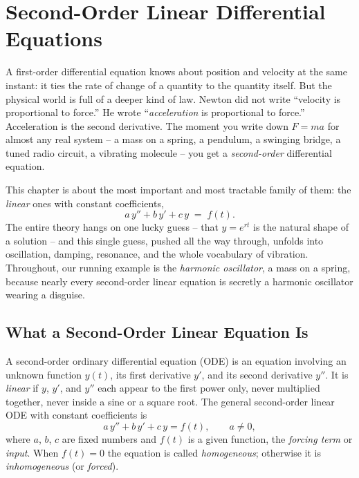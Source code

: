 \chapter{Second-Order Linear Differential Equations}

A first-order differential equation knows about position and velocity at the
same instant: it ties the rate of change of a quantity to the quantity itself.
But the physical world is full of a deeper kind of law. Newton did not write
``velocity is proportional to force.'' He wrote ``\emph{acceleration} is
proportional to force.'' Acceleration is the second derivative. The moment you
write down $F = ma$ for almost any real system -- a mass on a spring, a pendulum,
a swinging bridge, a tuned radio circuit, a vibrating molecule -- you get a
\emph{second-order} differential equation.

This chapter is about the most important and most tractable family of them: the
\emph{linear} ones with constant coefficients,
\[
  a\,y'' + b\,y' + c\,y \;=\; f(t).
\]
The entire theory hangs on one lucky guess -- that $y = e^{rt}$
is the natural shape of a solution -- and this single guess, pushed all the way
through, unfolds into oscillation, damping, resonance, and the whole vocabulary
of vibration. Throughout, our running example is the \emph{harmonic oscillator},
a mass on a spring, because nearly every second-order linear equation is secretly
a harmonic oscillator wearing a disguise.

\chapterline

\section{What a Second-Order Linear Equation Is}
\label{ch38:what}

A second-order ordinary differential equation (ODE) is an equation involving an
unknown function $y(t)$, its first derivative $y'$, and its second derivative
$y''$. It is \emph{linear} if $y$, $y'$, and $y''$ each appear to the first power
only, never multiplied together, never inside a sine or a square root. The
general second-order linear ODE with constant coefficients is
\begin{equation}
  a\,y'' + b\,y' + c\,y = f(t),
  \qquad a \neq 0,
  \label{ch38:general}
\end{equation}
where $a$, $b$, $c$ are fixed numbers and $f(t)$ is a given function, the
\emph{forcing term} or \emph{input}. When $f(t) = 0$ the equation is called
\emph{homogeneous}; otherwise it is \emph{inhomogeneous} (or \emph{forced}).

